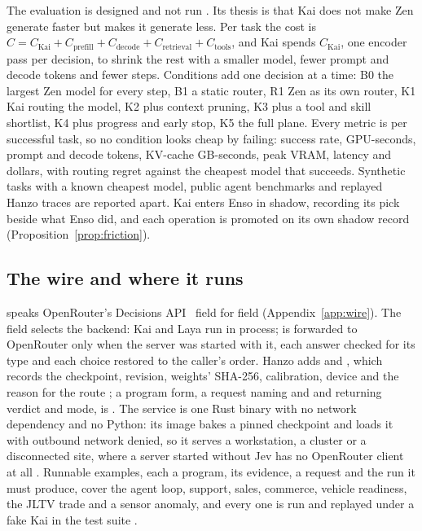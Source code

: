 The evaluation is designed and not run \proposed. Its thesis is that Kai does
not make Zen generate faster but makes it generate less. Per task the cost is
$C = C_{\mathrm{Kai}} + C_{\mathrm{prefill}} + C_{\mathrm{decode}} +
C_{\mathrm{retrieval}} + C_{\mathrm{tools}}$, and Kai spends
$C_{\mathrm{Kai}}$, one encoder pass per decision, to shrink the rest with a
smaller model, fewer prompt and decode tokens and fewer steps. Conditions add
one decision at a time: B0 the largest Zen model for every step, B1 a static
router, R1 Zen as its own router, K1 Kai routing the model, K2 plus context
pruning, K3 plus a tool and skill shortlist, K4 plus progress and early stop,
K5 the full plane. Every metric is per successful task, so no condition looks
cheap by failing: success rate, GPU-seconds, prompt and decode tokens, KV-cache
GB-seconds, peak VRAM, latency and dollars, with routing regret against the
cheapest model that succeeds. Synthetic tasks with a known cheapest model,
public agent benchmarks and replayed Hanzo traces are reported apart. Kai
enters Enso in shadow, recording its pick beside what Enso did, and each
operation is promoted on its own shadow record (Proposition~\ref{prop:friction}).

\subsection{The wire and where it runs}

 speaks OpenRouter's Decisions
API~\cite{openrouterdecisions} field for field (Appendix~\ref{app:wire}). The
 field selects the backend: Kai and Laya run in process;
 is forwarded to OpenRouter only when the server was
started with it, each answer checked for its type and each choice restored to
the caller's order. Hanzo adds  and , which
records the checkpoint, revision, weights' SHA-256, calibration, device and the
reason for the route \shipped; a program form, a request naming 
and  and returning verdict and mode, is \proposed. The service is one Rust binary with no
network dependency and no Python: its image bakes a pinned checkpoint and loads
it with outbound network denied, so it serves a workstation, a cluster or a
disconnected site, where a server started without Jev has no OpenRouter client
at all \shipped. Runnable examples, each a program, its evidence, a request and
the run it must produce, cover the agent loop, support, sales, commerce,
vehicle readiness, the JLTV trade and a sensor anomaly, and every one is run and
replayed under a fake Kai in the test suite \shipped.

